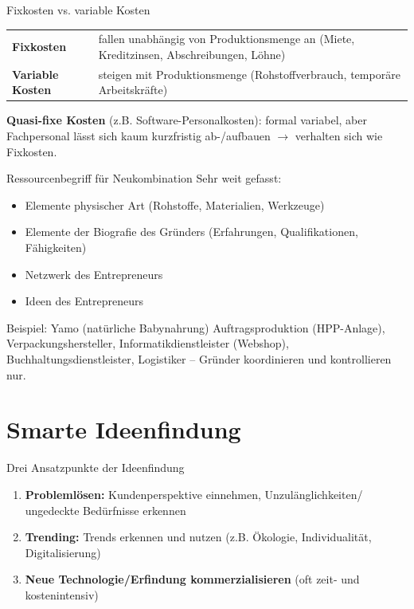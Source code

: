 \documentclass[a4paper, fontsize=7pt]{scrartcl}
\renewcommand*{\arraystretch}{1.5}  %
\begin{document}
\begin{subbox}{Fixkosten vs. variable Kosten}
\renewcommand*{\arraystretch}{1.3}
\begin{center}
\begin{tabularx}{\linewidth}{lX}
\textbf{Fixkosten} & fallen unabhängig von Produktionsmenge an (Miete,
Kreditzinsen, Abschreibungen, Löhne) \\
\textbf{Variable Kosten} & steigen mit Produktionsmenge (Rohstoffverbrauch,
temporäre Arbeitskräfte) \\
\end{tabularx}
\end{center}
\textbf{Quasi-fixe Kosten} (z.B. Software-Personalkosten): formal variabel, aber
Fachpersonal lässt sich kaum kurzfristig ab-/aufbauen $\to$ verhalten sich wie
Fixkosten.
\end{subbox}

\begin{mainbox}{Ressourcenbegriff für Neukombination}
Sehr weit gefasst:
\begin{itemize}
    \item Elemente physischer Art (Rohstoffe, Materialien, Werkzeuge)
    \item Elemente der Biografie des Gründers (Erfahrungen, Qualifikationen,
    Fähigkeiten)
    \item Netzwerk des Entrepreneurs
    \item Ideen des Entrepreneurs
\end{itemize}
\end{mainbox}

\begin{subbox}{Beispiel: Yamo (natürliche Babynahrung)}
Auftragsproduktion (HPP-Anlage), Verpackungshersteller, Informatikdienstleister
(Webshop), Buchhaltungsdienstleister, Logistiker -- Gründer koordinieren und
kontrollieren nur.
\end{subbox}

\section{Smarte Ideenfindung}

\begin{mainbox}{Drei Ansatzpunkte der Ideenfindung}
\begin{enumerate}
    \item \textbf{Problemlösen:} Kundenperspektive einnehmen, Unzulänglichkeiten/
    ungedeckte Bedürfnisse erkennen
    \item \textbf{Trending:} Trends erkennen und nutzen (z.B. Ökologie,
    Individualität, Digitalisierung)
    \item \textbf{Neue Technologie/Erfindung kommerzialisieren} (oft zeit- und
    kostenintensiv)
\end{enumerate}
\end{mainbox}
\end{document}
